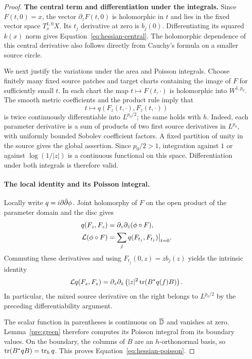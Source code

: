 \begin{proof}
\textbf{The central term and differentiation under the integrals.}
Since $F(t,0)=x$, the vector $\partial_z F(t,0)$ is holomorphic in $t$
and lies in the fixed vector space $T_x^{1,0}X$. Its $t_j$ derivative
at zero is $b_j(0)$. Differentiating its squared $k(x)$ norm gives
Equation~\eqref{eq:hessian-central}. The holomorphic dependence of this
central derivative also follows directly from Cauchy's formula on a
smaller source circle.

We next justify the variations under the area and Poisson integrals.
Choose finitely many fixed source patches and target charts containing
the image of $F$ for sufficiently small $t$. In each chart the map
$t\mapsto F(t,\cdot)$ is holomorphic into $W^{1,p_0}$. The smooth metric
coefficients and the product rule imply that
\[
 t\longmapsto q(F_z(t,\cdot),F_z(t,\cdot))
\]
is twice continuously differentiable into $L^{p_0/2}$; the same holds
with $h$. Indeed, each parameter derivative is a sum of products of two
first source derivatives in $L^{p_0}$, with uniformly bounded Sobolev
coefficient factors. A fixed partition of unity in the source gives the
global assertion. Since $p_0/2>1$, integration against $1$ or against
$\log(1/|z|)$ is a continuous functional on this space. Differentiation
under both integrals is therefore valid.

\paragraph{The local identity and its Poisson integral.}
Locally write $q=i\partial\bar\partial\phi$. Joint holomorphy of $F$ on the open product
of the parameter domain and the disc gives
\begin{align*}
 q(F_z,F_z)&=\partial_z\partial_{\bar z}(\phi\circ F),\\
 \mathcal L(\phi\circ F)&=\sum_j q(F_{t_j},F_{t_j})\big|_{t=0}.
\end{align*}
Commuting these derivatives and using $F_{t_j}(0,z)=zb_j(z)$ yields the
intrinsic identity
\begin{equation}\label{eq:local-hessian}
 \mathcal L q(F_z,F_z)
 =\partial_z\partial_{\bar z}
     \left(|z|^2\operatorname{tr}(B^*q(f)B)\right).
\end{equation}
In particular, the mixed source derivative on the right belongs to
$L^{p_0/2}$ by the preceding differentiability argument.

The scalar function in parentheses is continuous on $\overline{\mathbb D}$ and
vanishes at zero. Lemma~\ref{pre:green} therefore computes its Poisson
integral from its boundary values. On the boundary, the columns of $B$
are an $h$-orthonormal basis, so
$\operatorname{tr}(B^*qB)=\operatorname{tr}_h q$. This proves
Equation~\eqref{eq:hessian-poisson}.


\end{proof}
